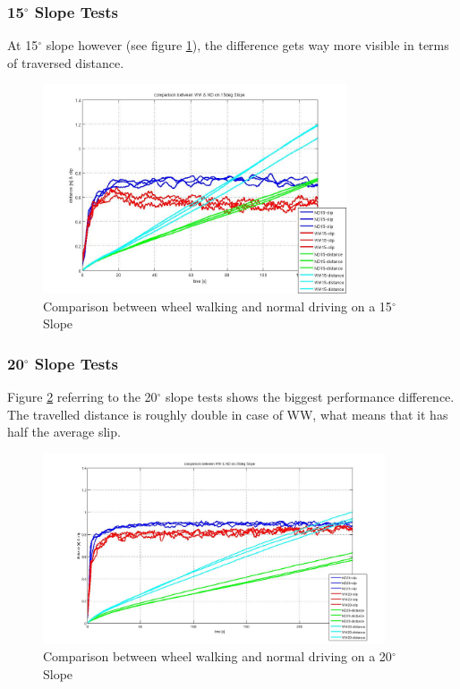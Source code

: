 \documentclass[a4paper,twocolumn]{esapub2005} %
\begin{document}
\subsubsection*{15$^{\circ}$ Slope Tests}
At 15$^\circ$ slope however (see figure \ref{fig:15d}), the difference gets way
more visible in terms of traversed distance.  

\begin{figure}[h!]
    \centering
    \includegraphics[width=0.8\textwidth]{15d.jpg}	\caption{Comparison between
    wheel walking and normal driving on a 15$^{\circ}$ Slope} \label{fig:15d}
\end{figure}

\subsubsection*{20$^{\circ}$ Slope Tests}
Figure \ref{fig:20d} referring to the 20$^\circ$ slope tests shows the biggest
performance difference. The travelled distance is roughly double in case of WW,
what means that it has half the average slip. 

\begin{figure}[h!]
    \centering
    \includegraphics[width=0.9\textwidth]{20d.jpg}	\caption{Comparison between
    wheel walking and normal driving on a 20$^{\circ}$ Slope} \label{fig:20d}
\end{figure}
\end{document}
